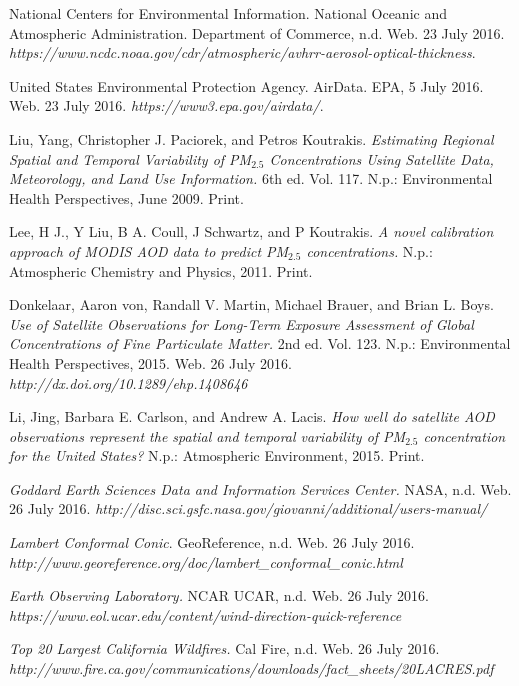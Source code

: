 \documentclass[10pt]{article}
\begin{document}
 \begin{thebibliography}{99}
 
  National Centers for Environmental Information. National Oceanic and Atmospheric Administration. Department of Commerce, n.d. Web. 23 July 2016. \textit{https://www.ncdc.noaa.gov/cdr/atmospheric/avhrr-aerosol-optical-thickness}.
 
  United States Environmental Protection Agency. AirData. EPA, 5 July 2016. Web. 23 July 2016. \textit{https://www3.epa.gov/airdata/}.
 
  Liu, Yang, Christopher J. Paciorek, and Petros Koutrakis. \textit{Estimating Regional Spatial and Temporal Variability of PM$_{2.5}$ Concentrations Using Satellite Data, Meteorology, and Land Use Information.} 6th ed. Vol. 117. N.p.: Environmental Health Perspectives, June 2009. Print.
 
  Lee, H J., Y Liu, B A. Coull, J Schwartz, and P Koutrakis. \textit{A novel calibration approach of MODIS AOD data to predict PM$_{2.5}$ concentrations.} N.p.: Atmospheric Chemistry and Physics, 2011. Print.
 
  Donkelaar, Aaron von, Randall V. Martin, Michael Brauer, and Brian L. Boys. \textit{Use of Satellite Observations for Long-Term Exposure Assessment of Global Concentrations of Fine Particulate Matter.} 2nd ed. Vol. 123. N.p.: Environmental Health Perspectives, 2015. Web. 26 July 2016. \textit{http://dx.doi.org/10.1289/ehp.1408646}
 
  Li, Jing, Barbara E. Carlson, and Andrew A. Lacis. \textit{ How well do satellite AOD observations represent the spatial and temporal variability of PM$_{2.5}$ concentration for the United States?} N.p.: Atmospheric Environment, 2015. Print.
 
  \textit{Goddard Earth Sciences Data and Information Services Center.} NASA, n.d. Web. 26 July 2016. \textit{http://disc.sci.gsfc.nasa.gov/giovanni/additional/users-manual/}
 
  \textit{Lambert Conformal Conic}. GeoReference, n.d. Web. 26 July 2016. \textit{http://www.georeference.org/doc/lambert\_conformal\_conic.html}
 
  \textit{Earth Observing Laboratory.} NCAR UCAR, n.d. Web. 26 July 2016. \textit{https://www.eol.ucar.edu/content/wind-direction-quick-reference}
 
 
  \textit{Top 20 Largest California Wildfires.} Cal Fire, n.d. Web. 26 July 2016. \textit{http://www.fire.ca.gov/communications/downloads/fact\_sheets/20LACRES.pdf}
 

\end{thebibliography}
\end{document}
